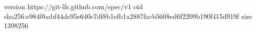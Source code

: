 version https://git-lfs.github.com/spec/v1
oid sha256:e9840babf44de95e640c7df8b1efb1a2887facb5608ed6f2209b190f415d919f
size 1398256

